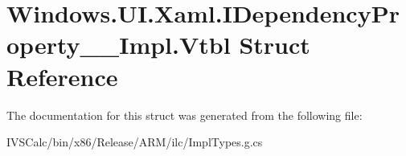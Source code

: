 \hypertarget{struct_windows_1_1_u_i_1_1_xaml_1_1_i_dependency_property_____impl_1_1_vtbl}{}\section{Windows.\+U\+I.\+Xaml.\+I\+Dependency\+Property\+\_\+\+\_\+\+Impl.\+Vtbl Struct Reference}
\label{struct_windows_1_1_u_i_1_1_xaml_1_1_i_dependency_property_____impl_1_1_vtbl}


The documentation for this struct was generated from the following file\+:\begin{DoxyCompactItemize}
\item 
I\+V\+S\+Calc/bin/x86/\+Release/\+A\+R\+M/ilc/Impl\+Types.\+g.\+cs\end{DoxyCompactItemize}
